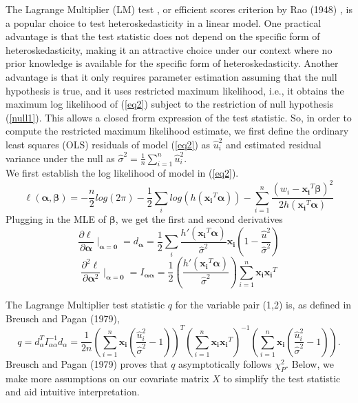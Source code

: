 \documentclass[12pt]{extarticle}
\theoremstyle{theorem}
\begin{document}
\noindent 
The Lagrange Multiplier (LM) test \cite{breusch1979simple}, or efficient scores criterion by Rao (1948) \cite{rao1948large}, is a popular choice to test heteroskedasticity in a linear model. One practical advantage is that the test statistic does not depend on the specific form of heteroskedasticity, making it an attractive choice under our context where no prior knowledge is available for the specific form of heteroskedasticity. Another advantage is that it only requires parameter estimation assuming that the null hypothesis is true, and it uses restricted maximum likelihood, i.e., it obtains the maximum log likelihood of (\ref{eq2}) subject to the restriction of null hypothesis (\ref{null1}). This allows a closed frorm expression of the test statistic. So, in order to compute the restricted maximum likelihood estimate, we first define the ordinary least squares (OLS) residuals of model (\ref{eq2}) as $\hat{u}_{i}^2$ and estimated residual variance under the null as $\hat{\sigma}^2 = \frac{1}{n} \sum_{i=1}^{n} \hat{u}_{i}^2$. \\

\noindent 
We first establish the log likelihood of model in (\ref{eq2}).
$$\ell(\bm{\alpha, \beta}) = -\frac{n}{2} log(2\pi) - \frac{1}{2} \sum_i log(h(\bm{x_i}^T \bm{\alpha})) - \sum_{i=1}^{n} \frac{(w_i - \bm{x_i}^T \bm{\beta})^2}{2h(\bm{x_i}^T \bm{\alpha})}$$
Plugging in the MLE of $\bm{\beta}$, we get the first and second derivatives
$$\frac{\partial \ell}{\partial \bm{\alpha}}\mid_{\bm{\alpha}=\bm{0}} = d_{\bm{\alpha}} = \frac{1}{2} \sum_i \frac{h'(\bm{x_i}^T \bm{\alpha})}{\hat{\sigma}^2} \bm{x_i} \left(
1-\frac{\hat{u}^2}{\hat{\sigma}^2}
\right)$$
$$\frac{\partial^2 \ell}{\partial \bm{\alpha}^2}\mid_{\bm{\alpha} = \bm{0}} = I_{\bm{\alpha}\bm{\alpha}} = \frac{1}{2} \left( \frac{h'(\bm{x_i}^T\bm{\alpha})}{\hat{\sigma}^2} \right) \sum_{i=1}^{n} \bm{x_i} \bm{x_i}^T$$

\noindent The Lagrange Multiplier test statistic $q$ for the variable pair (1,2) is, as defined in Breusch and Pagan (1979), 
\begin{equation}
q = d_{\alpha}^T I_{\alpha\alpha}^{-1}d_{\alpha} = \frac{1}{2n} \left( \sum_{i=1}^{n} \bm{x_i} \left( \frac{\hat{u}_{i}^2}{\hat{\sigma}^2} - 1 \right) \right)^T \left( \sum_{i=1}^{n} \bm{x_i} \bm{x_i}^T \right)^{-1} \left( \sum_{i=1}^{n} \bm{x_i} \left( \frac{\hat{u}_{i}^2}{\hat{\sigma}^2} - 1 \right) \right).
\label{q}
\end{equation}
Breusch and Pagan (1979) \cite{breusch1979simple} proves that $q$ asymptotically follows $\chi_{P}^2$. Below, we make more assumptions on our covariate matrix $X$ to simplify the test statistic and aid intuitive interpretation.\\
\end{document}
